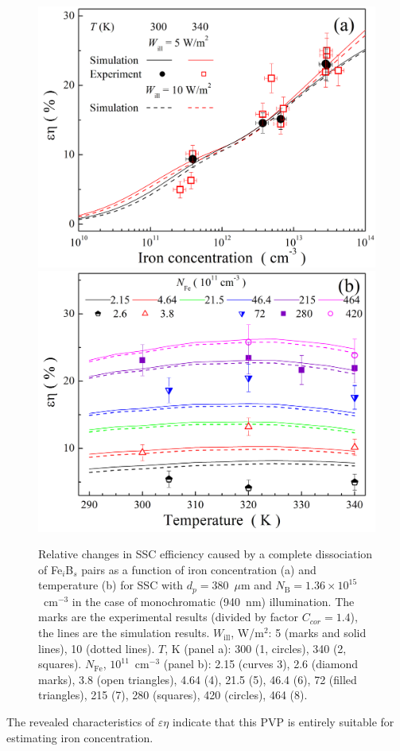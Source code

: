 \documentclass[a4paper,fleqn]{cas-sc}
\begin{document}
\begin{figure}
	\centering
     \includegraphics[width=0.4\linewidth]{Fig11a.png}
     \includegraphics[width=0.4\linewidth]{Fig11b.png}
	  \caption{Relative changes in SSC efficiency caused by a complete
       dissociation of Fe$_i$B$_s$ pairs as a function of iron concentration (a) and
       temperature (b) for SSC with $d_p=380$~$\mu$m and $N_\mathrm{B}=1.36\times10^{15}$~cm$^{-3}$
       in the case of monochromatic (940~nm) illumination.
       The marks are the experimental results (divided by factor $C_{cor}=1.4$), the lines are the simulation results.
       $W_\mathrm{ill}$, W/m$^{2}$: 5 (marks and solid lines), 10 (dotted lines).
       $T$, K (panel a): 300 (1, circles), 340 (2, squares).
       $N_\mathrm{Fe}$, $10^{11}$~cm$^{-3}$ (panel b): 2.15 (curves 3), 2.6 (diamond marks), 3.8 (open triangles), 4.64 (4),
       21.5 (5), 46.4 (6), 72 (filled triangles), 215 (7), 280 (squares), 420 (circles), 464 (8).
}\label{fig11}
\end{figure}

The revealed characteristics of $\varepsilon \eta$ indicate that this PVP
is entirely suitable for estimating iron concentration.
\end{document}
